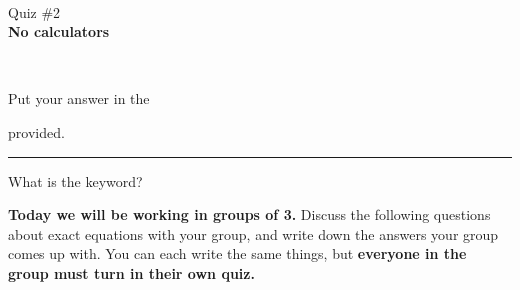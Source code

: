 \documentclass[12pt]{article}
\newcommand{\version}{}
\newcommand{\xzero}{}
\newcommand{\xone}{}
\newcommand{\xtwo}{}
\newcommand{\xthree}{}
\newcommand{\xfour}{}
\newcommand{\xfive}{}
\newcommand{\ExamName}{Quiz \#2\version}
\begin{document}
\renewcommand{\version}{}
\renewcommand{\xzero}{0.0}
\renewcommand{\xone}{1.3}
\renewcommand{\xtwo}{2.9}
\renewcommand{\xthree}{4.1}
\renewcommand{\xfour}{5.3}
\renewcommand{\xfive}{6.5}
% 
\begin{minipage}{0.25\linewidth}
  \CourseName\ \Quarter \\
  \ExamName \\[1em]
  \textbf{No calculators}\\[2em]
\end{minipage}
\hfill
\begin{minipage}[t]{0.4\linewidth}
\end{minipage}
\hfill
\begin{minipage}{0.25\linewidth}
  \vspace*{-3.25em}
  \ \hfill
\end{minipage}
\vspace*{-0.25in}

Put your answer in the 
provided.
\hfill
\begin{minipage}{0.5\linewidth}

\end{minipage}
\noindent\hspace*{-2em}\rule{\textwidth+4em}{1pt}%

\mbox{}

\begin{enumerate}
  \setcounter{problemnumber}{0}
	\Problem What is the keyword? 
\end{enumerate}

\textbf{Today we will be working in groups of 3.} Discuss the following questions about exact equations with your group, and write down the answers your group comes up with. You can each write the same things, but \textbf{everyone in the group must turn in their own quiz.}
\end{document}
